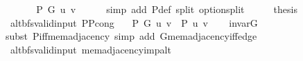 \begin{isabellebody}
\ \ \isamarkupfalse%
\ \isamarkupfalse%
\ {\isachardoublequoteopen}{\isachardot}{\kern0pt}{\isachardot}{\kern0pt}{\isachardot}{\kern0pt}\ {\isasymlongleftrightarrow}\ P\ G\ u\ v{\isachardoublequoteclose}\isanewline
\ \ \ \ \isamarkupfalse%
\ {\isacharparenleft}{\kern0pt}simp\ add{\isacharcolon}{\kern0pt}\ P{\isacharunderscore}{\kern0pt}def\ split{\isacharcolon}{\kern0pt}\ option{\isachardot}{\kern0pt}split{\isacharparenright}{\kern0pt}\isanewline
\ \ \isamarkupfalse%
\ \isamarkupfalse%
\ {\isacharquery}{\kern0pt}thesis\isanewline
\ \ \ \ \isacommand{{\isachardot}{\kern0pt}{\isachardot}{\kern0pt}}\isamarkupfalse%
\isanewline
{}\isamarkupfalse%
%
\endisatagproof
{\isafoldproof}%
%
\isadelimproof
\isanewline
%
\endisadelimproof
%
\isadeliminvisible
\isanewline
%
\endisadeliminvisible
%
\isataginvisible
{}\isamarkupfalse%
\ {\isacharparenleft}{\kern0pt}\ alt{\isacharunderscore}{\kern0pt}bfs{\isacharunderscore}{\kern0pt}valid{\isacharunderscore}{\kern0pt}input{\isacharparenright}{\kern0pt}\ P{\isacharunderscore}{\kern0pt}P{\isacharprime}{\kern0pt}{\isacharprime}{\kern0pt}{\isacharunderscore}{\kern0pt}cong{\isacharcolon}{\kern0pt}\isanewline
\ \ \ {\isachardoublequoteopen}P\ G{}\ u\ v\ {\isasymlongleftrightarrow}\ P{\isacharprime}{\kern0pt}{\isacharprime}{\kern0pt}\ {\isacharbraceleft}{\kern0pt}u{\isacharcomma}{\kern0pt}\ v{\isacharbraceright}{\kern0pt}{\isachardoublequoteclose}%
\endisataginvisible
{\isafoldinvisible}%
%
\isadeliminvisible
\isanewline
%
\endisadeliminvisible
%
\isadelimproof
\ \ %
\endisadelimproof
%
\isatagproof
{}\isamarkupfalse%
\ invar{\isacharunderscore}{\kern0pt}G{}\isanewline
\ \ \isamarkupfalse%
\ {\isacharparenleft}{\kern0pt}subst\ P{\isacharunderscore}{\kern0pt}iff{\isacharunderscore}{\kern0pt}mem{\isacharunderscore}{\kern0pt}adjacency{\isacharparenright}{\kern0pt}\ {\isacharparenleft}{\kern0pt}simp\ add{\isacharcolon}{\kern0pt}\ G{}{\isachardot}{\kern0pt}mem{\isacharunderscore}{\kern0pt}adjacency{\isacharunderscore}{\kern0pt}iff{\isacharunderscore}{\kern0pt}edge{\isacharparenright}{\kern0pt}{\isacharplus}{\kern0pt}%
\endisatagproof
{\isafoldproof}%
%
\isadelimproof
\isanewline
%
\endisadelimproof
%
\isadeliminvisible
\isanewline
%
\endisadeliminvisible
%
\isataginvisible
{}\isamarkupfalse%
\ {\isacharparenleft}{\kern0pt}\ alt{\isacharunderscore}{\kern0pt}bfs{\isacharunderscore}{\kern0pt}valid{\isacharunderscore}{\kern0pt}input{\isacharparenright}{\kern0pt}\ mem{\isacharunderscore}{\kern0pt}adjacency{\isacharunderscore}{\kern0pt}imp{\isacharunderscore}{\kern0pt}alt{\isacharcolon}{\kern0pt}\isanewline

\end{isabellebody}
